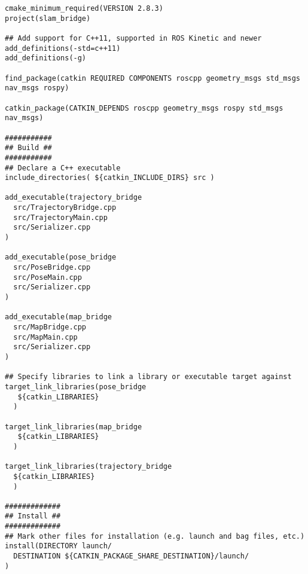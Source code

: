 \begin{lstlisting}[style = customcatkin]
cmake_minimum_required(VERSION 2.8.3)
project(slam_bridge)

## Add support for C++11, supported in ROS Kinetic and newer
add_definitions(-std=c++11)
add_definitions(-g)

find_package(catkin REQUIRED COMPONENTS roscpp geometry_msgs std_msgs nav_msgs rospy)

catkin_package(CATKIN_DEPENDS roscpp geometry_msgs rospy std_msgs nav_msgs)

###########
## Build ##
###########
## Declare a C++ executable
include_directories( ${catkin_INCLUDE_DIRS} src )

add_executable(trajectory_bridge
  src/TrajectoryBridge.cpp
  src/TrajectoryMain.cpp
  src/Serializer.cpp
)

add_executable(pose_bridge
  src/PoseBridge.cpp
  src/PoseMain.cpp
  src/Serializer.cpp
)

add_executable(map_bridge
  src/MapBridge.cpp
  src/MapMain.cpp
  src/Serializer.cpp
)

## Specify libraries to link a library or executable target against
target_link_libraries(pose_bridge
   ${catkin_LIBRARIES}
  )

target_link_libraries(map_bridge
   ${catkin_LIBRARIES}
  )

target_link_libraries(trajectory_bridge 
  ${catkin_LIBRARIES}
  )

#############
## Install ##
#############
## Mark other files for installation (e.g. launch and bag files, etc.)
install(DIRECTORY launch/
  DESTINATION ${CATKIN_PACKAGE_SHARE_DESTINATION}/launch/
)
\end{lstlisting}